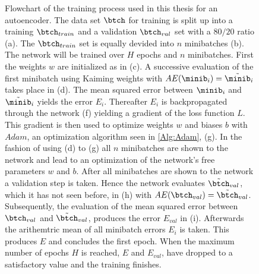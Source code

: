 \begin{figure}[htbp!]
	\centering
	
	\caption{\footnotesize Flowchart of the training process used in this thesis for an autoencoder. The data set \(\btch\) for training is split up into a training \(\btch_{train}\) and a validation \(\btch_{val}\) set with a \(80/20\) ratio (a). The \(\btch_{train}\) set is equally devided into \(n\) minibatches (b). The network will be trained over \(H\) epochs and \(n\) minibatches. First the weights \(w\) are initialized as in \cite{LeCun98} (c). A successive evaluation of the first minibatch using Kaiming weights with \(AE(\minib_{i})=\tilde{\minib}_{i}\) takes place in (d). The mean squared error between \(\minib_{i}\) and \(\tilde{\minib}_{i}\) yields the error \(E_{i}\). Thereafter \(E_{i}\) is backpropagated through the network (f) yielding a gradient of the loss function \(L\). This gradient is then used to optimize weights \(w\) and biases \(b\) with  \(Adam\), an optimization algorithm seen in \cref{Alg:Adam}, (g). In the fashion of using (d) to (g) all \(n\) minibatches are shown to the network and lead to an optimization of the network's free parameters \(w\) and \(b\). After all minibatches are shown to the network a validation step is taken. Hence the network evaluates \(\tilde{\btch}_{val}\), which it has not seen before, in (h) with \(AE(\btch_{val})=\tilde{\btch}_{val}\). Subsequently, the evaluation of the mean squared error between \(\btch_{val}\) and \(\tilde{\btch}_{val}\), produces the error \(E_{val}\) in (i). Afterwards the arithemtric mean of all minibatch errors \(E_{i}\) is taken. This produces \(E\) and concludes the first epoch. When the maximum number of epochs \(H\) is reached, \(E\) and \(E_{val}\), have dropped to a satisfactory value and the training finishes.}
	\label{Fig:Training}
\end{figure}

